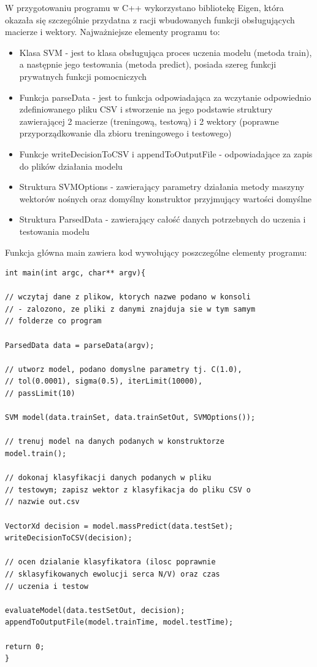 \documentclass[[10pt,a4paper]{article}
\begin{document}
W przygotowaniu programu w C++ wykorzystano bibliotekę Eigen, która okazała się szczególnie przydatna z racji wbudowanych funkcji obsługujących macierze i wektory. Najważniejsze elementy programu to:
\begin{itemize}
	\item Klasa SVM - jest to klasa obsługująca proces uczenia modelu (metoda train), a następnie jego testowania (metoda predict), posiada szereg funkcji prywatnych funkcji pomocniczych
	\item Funkcja parseData - jest to funkcja odpowiadająca za wczytanie odpowiednio zdefiniowanego pliku CSV i stworzenie na jego podstawie struktury zawierającej 2 macierze (treningową, testową) i 2 wektory (poprawne przyporządkowanie dla zbioru treningowego i testowego)
	\item Funkcje writeDecisionToCSV i appendToOutputFile - odpowiadające za zapis do plików działania modelu
	\item Struktura SVMOptions - zawierający parametry działania metody maszyny wektorów nośnych oraz domyślny konstruktor przyjmujący wartości domyślne
	\item Struktura ParsedData - zawierający całość danych potrzebnych do uczenia i testowania modelu
\end{itemize}

Funkcja główna main zawiera kod wywołujący poszczególne elementy programu:

\begin{lstlisting}
int main(int argc, char** argv){

// wczytaj dane z plikow, ktorych nazwe podano w konsoli
// - zalozono, ze pliki z danymi znajduja sie w tym samym
// folderze co program

ParsedData data = parseData(argv);

// utworz model, podano domyslne parametry tj. C(1.0),
// tol(0.0001), sigma(0.5), iterLimit(10000),
// passLimit(10)

SVM model(data.trainSet, data.trainSetOut, SVMOptions());

// trenuj model na danych podanych w konstruktorze
model.train();

// dokonaj klasyfikacji danych podanych w pliku
// testowym; zapisz wektor z klasyfikacja do pliku CSV o
// nazwie out.csv

VectorXd decision = model.massPredict(data.testSet);
writeDecisionToCSV(decision);

// ocen dzialanie klasyfikatora (ilosc poprawnie
// sklasyfikowanych ewolucji serca N/V) oraz czas
// uczenia i testow

evaluateModel(data.testSetOut, decision);
appendToOutputFile(model.trainTime, model.testTime);

return 0;
}
\end{lstlisting}
\end{document}
